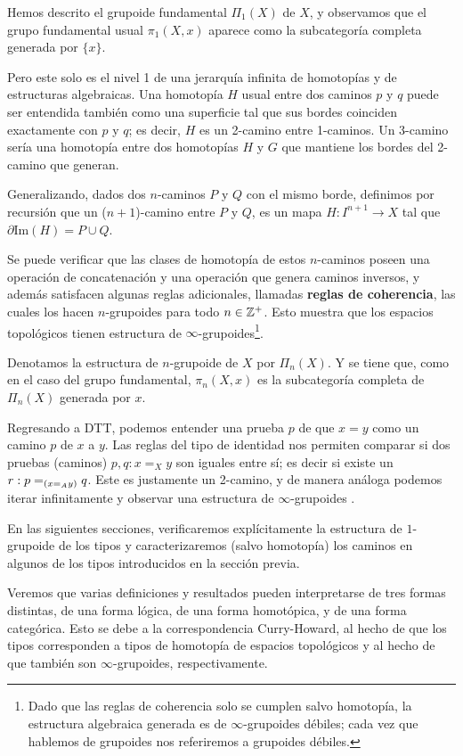 \documentclass[../main.tex]{subfiles}
\begin{document}
Hemos descrito el grupoide fundamental $\Pi_1(X)$ de $X$, y observamos que el grupo fundamental usual $\pi_1(X,x)$ aparece como la subcategor\'ia completa generada por $\{x\}$.

Pero este solo es el nivel 1 de una jerarquía infinita de homotop\'ias y de estructuras algebraicas.
Una homotop\'ia $H$ usual entre dos caminos $p$ y $q$ puede ser entendida también como una superficie tal que sus bordes coinciden exactamente con $p$ y $q$; es decir, $H$ es un 2-camino entre 1-caminos. Un 3-camino ser\'ia una homotop\'ia entre dos homotop\'ias $H$ y $G$ que mantiene los bordes del 2-camino que generan.

Generalizando, dados dos $n$-caminos $P$ y $Q$ con el mismo borde, definimos por recursi\'on que un ($n+1$)-camino entre $P$ y $Q$, es un mapa $H:I^{n+1}\to X$ tal que $\partial \text{Im}(H)=P \cup Q$.

Se puede verificar que las clases de homotop\'ia de estos $n$-caminos poseen una operación de concatenaci\'on y una operaci\'on que genera caminos inversos, y adem\'as satisfacen algunas reglas adicionales, llamadas \textbf{reglas de coherencia}, las cuales los hacen $n$-grupoides para todo $n \in \Z^+$.
Esto muestra que los espacios topol\'ogicos tienen estructura de $\infty$-grupoides\footnote{Dado que las reglas de coherencia solo se cumplen salvo homotop\'ia, la estructura algebraica generada es de $\infty$-grupoides d\'ebiles; cada vez que hablemos de grupoides nos referiremos a grupoides d\'ebiles.}.

Denotamos la estructura de $n$-grupoide de $X$ por $\Pi_n(X)$.
Y se tiene que, como en el caso del grupo fundamental, $\pi_n(X,x)$ es la subcategor\'ia completa de $\Pi_n(X)$ generada por $x$.

Regresando a DTT, podemos entender una prueba $p$ de que $x=y$ como un camino $p$ de $x$ a $y$.
Las reglas del tipo de identidad nos permiten comparar si dos pruebas (caminos) $p,q:x=_X y$ son iguales entre s\'i; es decir si existe un $r : \id[{(\id[A]{x}{y})}]{p}{q}$. Este es justamente un 2-camino, y de manera an\'aloga podemos iterar infinitamente y observar una estructura de $\infty$-grupoides \cite{curien_weak_2009} \cite{van_den_berg_types_2011}.

En las siguientes secciones, verificaremos expl\'icitamente la estructura de $1$-grupoide de los tipos y caracterizaremos (salvo homotop\'ia) los caminos en algunos de los tipos introducidos en la secci\'on previa.

Veremos que varias definiciones y resultados pueden interpretarse de tres formas distintas, de una forma l\'ogica, de una forma homot\'opica, y de una forma categ\'orica.
Esto se debe a la correspondencia Curry-Howard, al hecho de que los tipos corresponden a tipos de homotop\'ia de espacios topológicos y al hecho de que también son $\infty$-grupoides, respectivamente.
\end{document}
